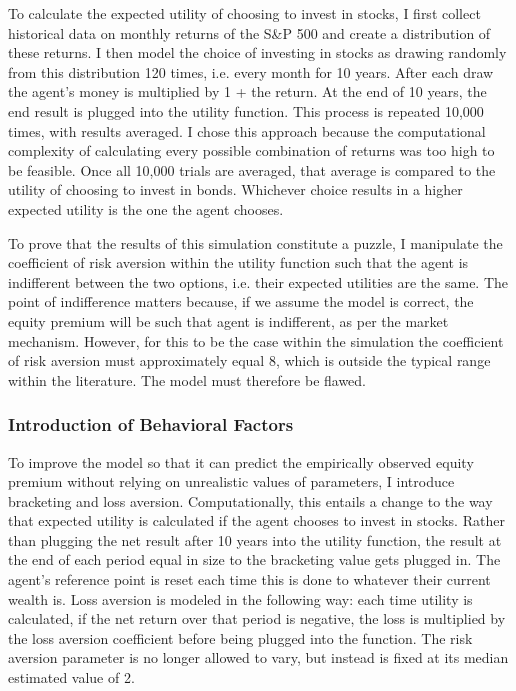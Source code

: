 \documentclass[10pt,twocolumn]{article}
\begin{document}
To calculate the expected utility of choosing to invest in stocks, I first collect historical data on monthly returns of the S\&P 500 and create a distribution of these returns. I then model the choice of investing in stocks as drawing randomly from this distribution 120 times, i.e. every month for 10 years. After each draw the agent's money is multiplied by 1 + the return. At the end of 10 years, the end result is plugged into the utility function. This process is repeated 10,000 times, with results averaged. I chose this approach because the computational complexity of calculating every possible combination of returns was too high to be feasible. Once all 10,000 trials are averaged, that average is compared to the utility of choosing to invest in bonds. Whichever choice results in a higher expected utility is the one the agent chooses. 

To prove that the results of this simulation constitute a puzzle, I manipulate the coefficient of risk aversion within the utility function such that the agent is indifferent between the two options, i.e. their expected utilities are the same. The point of indifference matters because, if we assume the model is correct, the equity premium will be such that agent is indifferent, as per the market mechanism. However, for this to be the case within the simulation the coefficient of risk aversion must approximately equal 8, which is outside the typical range within the literature. The model must therefore be flawed. 

\subsubsection{Introduction of Behavioral Factors}
To improve the model so that it can predict the empirically observed equity premium without relying on unrealistic values of parameters, I introduce bracketing and loss aversion. Computationally, this entails a change to the way that expected utility is calculated if the agent chooses to invest in stocks. Rather than plugging the net result after 10 years into the utility function, the result at the end of each period equal in size to the bracketing value gets plugged in. The agent's reference point is reset each time this is done to whatever their current wealth is. Loss aversion is modeled in the following way: each time utility is calculated, if the net return over that period is negative, the loss is multiplied by the loss aversion coefficient before being plugged into the function. The risk aversion parameter is no longer allowed to vary, but instead is fixed at its median estimated value of 2. 
\end{document}
